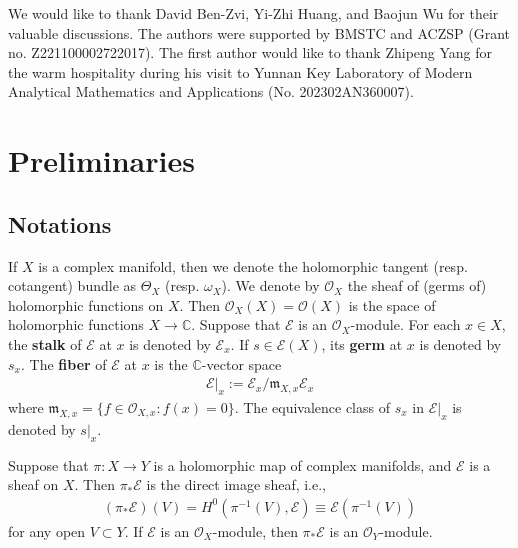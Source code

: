\documentclass[11pt,b5paper,notitlepage]{article}
\theoremstyle{definition}
\theoremstyle{plain}
\newcommand{\mc}{\mathcal}
\newcommand{\scr}{\mathscr}
\newcommand{\Cbb}{\mathbb C}
\newcommand{\<}{\left\langle}
\renewcommand{\>}{\right\rangle}
\newcommand{\mk}{\mathfrak m}
\numberwithin{equation}{section}
\begin{document}
We would like to thank David Ben-Zvi, Yi-Zhi Huang, and Baojun Wu for their valuable discussions. The authors were supported by BMSTC and ACZSP (Grant no. Z221100002722017). The first author would like to thank Zhipeng Yang for the warm hospitality during his visit to Yunnan Key Laboratory of Modern Analytical Mathematics and Applications (No. 202302AN360007).







































\section{Preliminaries}

\subsection{Notations}

If $X$ is a complex manifold, then we denote the holomorphic tangent (resp. cotangent) bundle as $\Theta_X$ (resp. $\omega_X$). We denote by $\mc O_X$ the sheaf of (germs of) holomorphic functions on $X$. Then $\mc O_X(X)=\mc O(X)$ is the space of holomorphic functions $X\rightarrow\Cbb$. Suppose that $\scr E$ is an $\mc O_X$-module. For each $x\in X$, the \textbf{stalk} of $\scr E$ at $x$ is denoted by $\scr E_x$. If $s\in\scr E(X)$, its \textbf{germ} at $x$ is denoted by $s_x$. The \textbf{fiber} of $\scr E$ at $x$ is the $\Cbb$-vector space
\begin{align}
\scr E|_x:=\scr E_x/\mk_{X,x}\scr E_x
\end{align}  
where $\mk_{X,x}=\{f\in\mc O_{X,x}:f(x)=0\}$. The equivalence class of $s_x$ in $\scr E|_x$ is denoted by $s|_x$.

Suppose that $\pi:X\rightarrow Y$ is a holomorphic map of complex manifolds, and $\scr E$ is a sheaf on $X$. Then $\pi_*\scr E$ is the direct image sheaf, i.e.,
\begin{align*}
(\pi_*\scr E)(V)=H^0(\pi^{-1}(V),\scr E)\equiv \scr E(\pi^{-1}(V))
\end{align*}
for any open $V\subset Y$. If $\scr E$ is an $\scr O_X$-module, then $\pi_*\scr E$ is an $\scr O_Y$-module.
\end{document}
